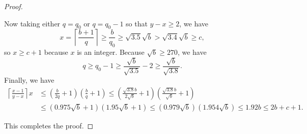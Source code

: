 \documentclass[10pt,a4paper]{amsart}
\begin{document}
\begin{proof}
\begin{case}
Now taking either $q=q_0$ or $q=q_0-1$ so that $y-x\geq 2$, we have
\begin{equation*}
x=\left\lceil\frac{b+1}q\right\rceil\geq\frac b{q_0}\geq\sqrt{3.5}\sqrt b>\sqrt{3.4}\sqrt b\geq c,
\end{equation*}
so $x\geq c+1$ because $x$ is an integer. Because $\sqrt b\geq 270$, we have 
\begin{equation*}q\geq q_0-1\geq \frac{\sqrt b}{\sqrt{3.5}}-2\geq\frac{\sqrt b}{\sqrt{3.8}}.\end{equation*} Finally, we have
\begin{align*}
\left\lceil\frac{x-1}{y-x}\right\rceil x&\leq\left(\frac b{2q}+1\right)\left(\frac bq+1\right)\leq \left(\frac {\sqrt{3.8}b}{2\sqrt b}+1\right)\left(\frac{\sqrt{3.8}b}{\sqrt b}+1\right)\\&\leq(0.975\sqrt b+1)(1.95\sqrt b+1)\leq (0.979\sqrt b)(1.954\sqrt b)\leq 1.92b\leq 2b+c+1.
\end{align*}
\end{case}
This completes the proof.
\end{proof}
\end{document}
